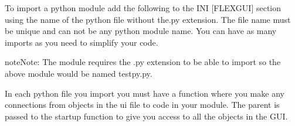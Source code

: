 \documentclass[letterpaper,10pt,english]{sphinxmanual}
\begin{document}
\sphinxAtStartPar
To import a python module add the following to the INI {[}FLEXGUI{]} section using the
name of the python file without the.py extension. The file name must be unique
and can not be any python module name. You can have as many imports as you need
to simplify your code.

\begin{sphinxVerbatim}[commandchars=\\\{\}]
\PYG{p}{[}\PYG{p}{]}
  
\end{sphinxVerbatim}

\begin{sphinxadmonition}{note}{Note:}
\sphinxAtStartPar
The module requires the .py extension to be able to import so the
above module would be named testpy.py.
\end{sphinxadmonition}

\sphinxAtStartPar
In each python file you import you must have a  function where you make
any connections from objects in the ui file to code in your module. The parent
is passed to the startup function to give you access to all the objects in the
GUI.
\end{document}
